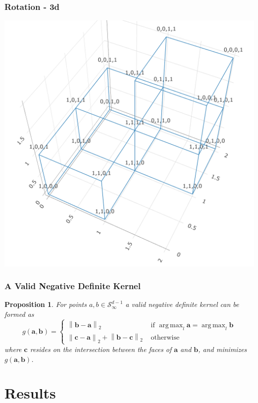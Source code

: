 \documentclass[aspectratio=169]{beamer}
\newcommand{\norm}[1]{\left\lVert #1 \right\rVert}
\newcommand{\pnorm}[2]{\norm{#1}_{#2}}
\newtheorem{prop}{Proposition}
\DeclareMathOperator*{\argmax}{arg\,max}
\newlength{\frametextheight}
\begin{document}
\begin{frame}
    \frametitle{Rotation - 3d}
    \begin{center}
        \includegraphics[height=\frametextheight]{./images/rot_4d_3d}
    \end{center}
\end{frame}

\begin{frame}
  \frametitle{A Valid Negative Definite Kernel}
  \begin{prop}
    For points $a,b \in \mathcal{S}_{\infty}^{d-1}$ a valid negative definite kernel can be formed as
    \begin{equation*}
      g(\bm{a},\bm{b}) = \begin{cases}
        \pnorm{\bm{b}-\bm{a}}{2} &\text{ if }\argmax_l\bm{a} = \argmax_l\bm{b}\\
        \pnorm{\bm{c}-\bm{a}}{2} + \pnorm{\bm{b}-\bm{c}}{2} &\text{ otherwise}
      \end{cases}
    \end{equation*}
    where $\bm{c}$ resides on the intersection between the faces of $\bm{a}$ and $\bm{b}$, and
                minimizes $g(\bm{a},\bm{b})$.
  \end{prop}
\end{frame}


\section{Results}
\end{document}

